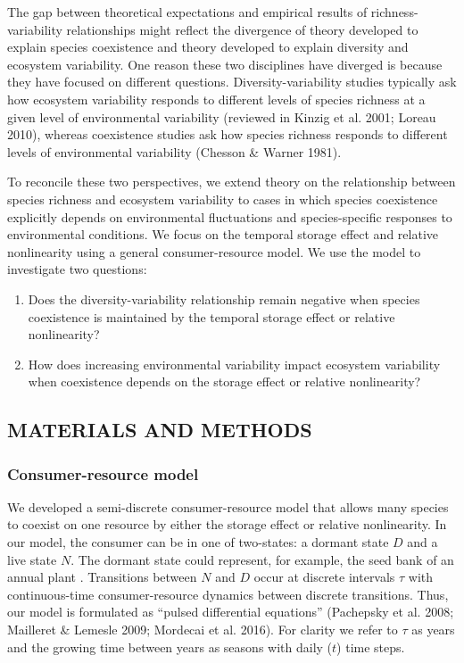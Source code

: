 \documentclass[12pt,]{article}
\begin{document}
The gap between theoretical expectations and empirical results of
richness-variability relationships might reflect the divergence of
theory developed to explain species coexistence and theory developed to
explain diversity and ecosystem variability. One reason these two
disciplines have diverged is because they have focused on different
questions. Diversity-variability studies typically ask how ecosystem
variability responds to different levels of species richness at a given
level of environmental variability (reviewed in Kinzig et al. 2001;
Loreau 2010), whereas coexistence studies ask how species richness
responds to different levels of environmental variability (Chesson \&
Warner 1981).

To reconcile these two perspectives, we extend theory on the
relationship between species richness and ecosystem variability to cases
in which species coexistence explicitly depends on environmental
fluctuations and species-specific responses to environmental conditions.
We focus on the temporal storage effect and relative nonlinearity using
a general consumer-resource model. We use the model to investigate two
questions:

\begin{enumerate}
\def\labelenumi{\arabic{enumi}.}
\item
  Does the diversity-variability relationship remain negative when
  species coexistence is maintained by the temporal storage effect or
  relative nonlinearity?
\item
  How does increasing environmental variability impact ecosystem
  variability when coexistence depends on the storage effect or relative
  nonlinearity?
\end{enumerate}

\subsection{MATERIALS AND METHODS}\label{materials-and-methods}

\subsubsection{Consumer-resource model}\label{consumer-resource-model}

We developed a semi-discrete consumer-resource model that allows many
species to coexist on one resource by either the storage effect or
relative nonlinearity. In our model, the consumer can be in one of
two-states: a dormant state \(D\) and a live state \(N\). The dormant
state could represent, for example, the seed bank of an annual plant
. Transitions between \(N\)
and \(D\) occur at discrete intervals \(\tau\) with continuous-time
consumer-resource dynamics between discrete transitions. Thus, our model
is formulated as ``pulsed differential equations'' (Pachepsky et al.
2008; Mailleret \& Lemesle 2009; Mordecai et al. 2016). For clarity we
refer to \(\tau\) as years and the growing time between years as seasons
with daily (\(t\)) time steps.
\end{document}
